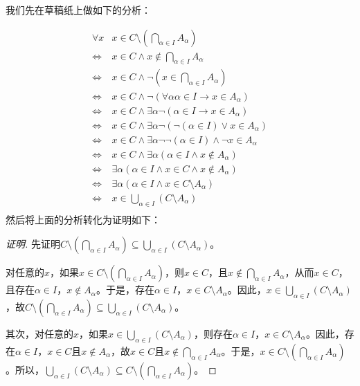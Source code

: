 \documentclass{book}[oneside]
\begin{document}
\begin{CJK*}{UTF8}{gbsn}
  我们先在草稿纸上做如下的分析：

  \begin{equation*}
    \begin{split}
      \forall x&x \in C\setminus (\bigcap_{\alpha \in I}A_{\alpha})\\
      \Leftrightarrow &x \in C \land x \notin \bigcap_{\alpha \in I}A_{\alpha}\\
      \Leftrightarrow &x \in C \land \lnot (x \in \bigcap_{\alpha \in I}A_{\alpha})\\
      \Leftrightarrow &x \in C \land \lnot (\forall \alpha \alpha \in I \to x \in A_{\alpha})\\
      \Leftrightarrow &x \in C \land \exists \alpha \lnot (\alpha \in I \to x \in A_{\alpha})\\
      \Leftrightarrow &x \in C \land \exists \alpha \lnot (\lnot (\alpha \in I) \lor x \in A_{\alpha})\\
      \Leftrightarrow &x \in C \land \exists \alpha \lnot \lnot (\alpha \in I) \land \lnot x\in A_{\alpha}\\
      \Leftrightarrow &x \in C \land \exists \alpha (\alpha \in I \land x\notin A_{\alpha})\\
      \Leftrightarrow &\exists \alpha (\alpha \in I \land x\in C \land x \notin A_{\alpha})\\
      \Leftrightarrow &\exists \alpha (\alpha \in I \land x\in C\setminus A_{\alpha})\\
      \Leftrightarrow &x \in \bigcup_{\alpha \in I} (C\setminus A_{\alpha}) \\
    \end{split}
  \end{equation*}
  然后将上面的分析转化为证明如下：  
  \begin{proof}[证明]
    先证明$C\setminus(\bigcap_{\alpha \in I}A_{\alpha})\subseteq \bigcup_{\alpha\in I}(C\setminus A_{\alpha})$。

  对任意的$x$，如果$x \in C\setminus (\bigcap_{\alpha \in I}A_{\alpha})$，则$x\in C$，且$x \notin \bigcap_{\alpha \in I}A_{\alpha}$，从而$x\in C$，且存在$\alpha \in I$，$x\notin A_{\alpha}$。于是，存在$\alpha \in I$，$x\in C\setminus A_{\alpha}$。因此，$x \in \bigcup_{\alpha \in I}( C\setminus A_{\alpha})$，故$C\setminus (\bigcap_{\alpha \in I}A_{\alpha})\subseteq \bigcup_{\alpha\in I}(C\setminus A_{\alpha})$。

    其次，对任意的$x$，如果$x\in \bigcup_{\alpha\in I}(C\setminus A_{\alpha})$，则存在$\alpha \in I$，$x\in C\setminus A_{\alpha}$。因此，存在$\alpha \in I$，$x\in C$且$x\notin A_{\alpha}$，故$x\in C$且$x\notin \bigcap_{\alpha \in I}A_{\alpha}$。于是，$x \in C\setminus (\bigcap_{\alpha \in I}A_{\alpha})$。所以，$\bigcup_{\alpha\in I}(C\setminus A_{\alpha})\subseteq C\setminus (\bigcap_{\alpha \in I}A_{\alpha})$。


\end{proof}
\end{CJK*}
\end{document}
